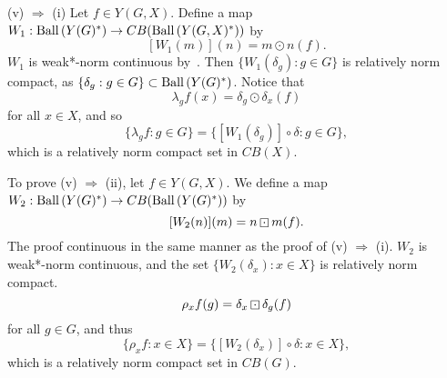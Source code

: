 (v) $\Rightarrow$ (i) Let $f\in Y(G,X)$.  Define a map $W_1: \operatorname{Ball\,}(Y(G)^*) \rightarrow CB(\operatorname{Ball\,}(Y(G,X)^*))$ by
\[
[W_1(m)](n) = m\odot n(f).
\]
$W_1$ is weak*-norm continuous by~\cite[Lemma B.3]{milnes}.  Then $\{W_1(\delta_g):g\in G\}$ is
relatively norm compact, as $\{\delta_g:g\in G\} \subset \operatorname{Ball\,}(Y(G)^*)$.  Notice that
\[
\lambda_g f(x) = \delta_g \odot \delta_x (f)
\]
for all $x\in X$, and so
\[
\{\lambda_g f: g\in G\} = \{[W_1(\delta_g)] \circ \delta: g\in G\},
\]
which is a relatively norm compact set in $CB(X)$.

To prove (v) $\Rightarrow$ (ii),  let $f\in Y(G,X)$.    We define a map
$W_2: \operatorname{Ball\,}(Y(G)^*)\rightarrow CB(\operatorname{Ball\,}(Y(G)^*))$ by
\[
[W_2(n)](m) = n\dotbox m(f).
\]
The proof continuous in the same manner as the proof of (v) $\Rightarrow$ (i).
$W_2$ is weak*-norm continuous, and the set $\{W_2(\delta_x):x\in X\}$ is relatively norm compact.
\[
\rho_x f(g) = \delta_x \dotbox \delta_g (f)
\]
for all $g\in G$, and thus
\[
\{\rho_x f: x\in X\} = \{[W_2(\delta_x)]\circ \delta: x\in X\},
\]
which is a relatively norm compact set in $CB(G)$.

